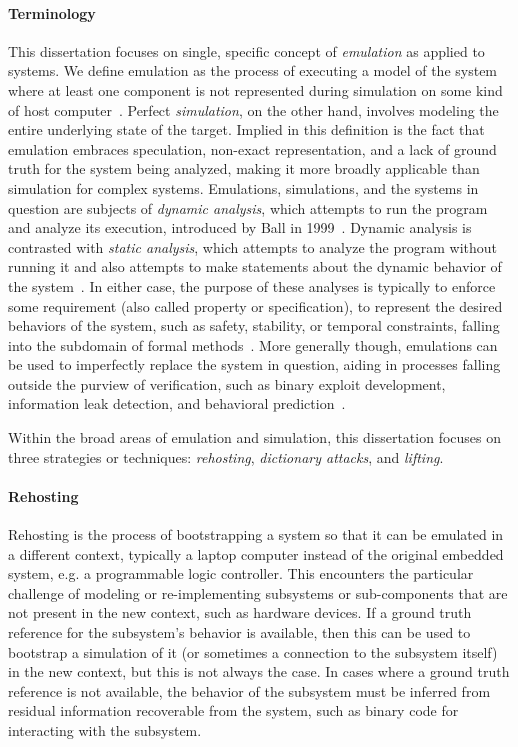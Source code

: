\paragraph{Terminology}
This dissertation focuses on single, specific concept of \emph{emulation} as applied to systems.
We define emulation as the process of executing a model of the system where at least one component is not represented during simulation on some kind of host computer~\cite{marwedel2021embedded}.
Perfect \emph{simulation}, on the other hand, involves modeling the entire underlying state of the target.
Implied in this definition is the fact that emulation embraces speculation, non-exact representation, and a lack of ground truth for the system being analyzed, making it more broadly applicable than simulation for complex systems.
Emulations, simulations, and the systems in question are subjects of \emph{dynamic analysis}, which attempts to run the program and analyze its execution, introduced by Ball in 1999~\cite{ball1999concept}.
Dynamic analysis is contrasted with \emph{static analysis}, which attempts to analyze the program without running it and also attempts to make statements about the dynamic behavior of the system~\cite{chess2004static}.
In either case, the purpose of these analyses is typically to enforce some requirement (also called property or specification), to represent the desired behaviors of the system, such as safety, stability, or temporal constraints, falling into the subdomain of formal methods~\cite{woodcock2009formal, leeb2005proving}.
More generally though, emulations can be used to imperfectly replace the system in question, aiding in processes falling outside the purview of verification, such as binary exploit development, information leak detection, and behavioral prediction~\cite{huang2014software, le2018micro, landsiedel2005accurate}.

Within the broad areas of emulation and simulation, this dissertation focuses on three strategies or techniques: \emph{rehosting}, \emph{dictionary attacks}, and \emph{lifting}.

\paragraph{Rehosting}
Rehosting is the process of bootstrapping a system so that it can be emulated in a different context, typically a laptop computer instead of the original embedded system, e.g. a programmable logic controller.
This encounters the particular challenge of modeling or re-implementing subsystems or sub-components that are not present in the new context, such as hardware devices.
If a ground truth reference for the subsystem's behavior is available, then this can be used to bootstrap a simulation of it (or sometimes a connection to the subsystem itself) in the new context, but this is not always the case.
In cases where a ground truth reference is not available, the behavior of the subsystem must be inferred from residual information recoverable from the system, such as binary code for interacting with the subsystem.

